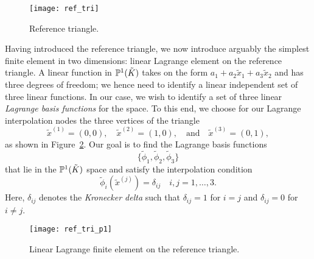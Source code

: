\begin{figure}
  \centering
  \texttt{[image: ref\_tri]}
  \caption{Reference triangle.}
  \label{fig:fe_ref_tri}
\end{figure}

Having introduced the reference triangle, we now introduce arguably the simplest finite element in two dimensions: linear Lagrange element on the reference triangle. A linear function in $\mathbb{P}^1(\tilde K)$ takes on the form $a_1 + a_2 \tilde x_1 + a_3 \tilde x_2$ and has three degrees of freedom; we hence need to identify a linear independent set of three linear functions.  In our case, we wish to identify a set of three linear \emph{Lagrange basis functions} for the space.  To this end, we choose for our Lagrange interpolation nodes the three vertices of the triangle
\begin{equation*}
  \tilde x^{(1)} = (0,0), \quad \tilde x^{(2)} = (1,0), \quad \text{and} \quad \tilde x^{(3)} = (0,1),
\end{equation*}
as shown in Figure~\ref{fig:fe_ref_tri_p1}. Our goal is to find the Lagrange basis functions
\begin{equation*}
  \{ \tilde \phi_1, \tilde \phi_2, \tilde \phi_3 \}
\end{equation*}
that lie in the $\mathbb{P}^1(\tilde K)$ space and satisfy the interpolation condition
\begin{equation}
  \tilde \phi_i(\tilde x^{(j)}) = \delta_{ij} \quad i,j = 1,\dots,3.
   \label{eq:fe_interp_tri}
\end{equation}
Here, $\delta_{ij}$ denotes the \emph{Kronecker delta} such that $\delta_{ij} = 1$ for $i = j$ and $\delta_{ij} = 0$ for $i \neq j$.

\begin{figure}
  \centering
  \texttt{[image: ref\_tri\_p1]}
  \caption{Linear Lagrange finite element on the reference triangle.}
  \label{fig:fe_ref_tri_p1}
\end{figure}


